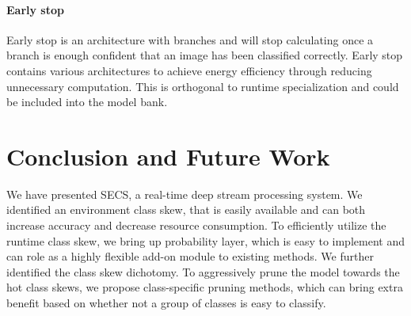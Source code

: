 \documentclass[pageno]{jpaper}
\begin{document}
\paragraph{Early stop}
Early stop \cite{teerapittayanon2016branchynet, panda2016conditional} is an architecture with branches and will stop calculating once a branch is enough confident that an image has been classified correctly. Early stop contains various architectures to achieve energy efficiency through reducing unnecessary computation. This is orthogonal to runtime specialization and could be included into the model bank.

\section{Conclusion and Future Work} \label{conclusion}
We have presented SECS, a real-time deep stream processing system. We identified an environment class skew, that is easily available and can both increase accuracy and decrease resource consumption. To efficiently utilize the runtime class skew, we bring up probability layer, which is easy to implement and can role as a highly flexible add-on module to existing methods. We further identified the class skew dichotomy. To aggressively prune the model towards the hot class skews, we propose class-specific pruning methods, which can bring extra benefit based on whether not a group of classes is easy to classify.







\end{document}
